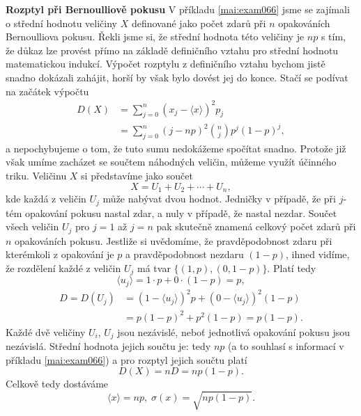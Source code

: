 \begin{mdframed}[style=mdexam]
  \begin{example}\label{mai:exam072}
    \textbf{Rozptyl při Bernoulliově pokusu}\newline
    V příkladu \ref{mai:exam066} jsme se zajímali o střední hodnotu veličiny \(X\) definované jako
    počet zdarů při \(n\) opakováních Bernoulliova pokusu. Řekli jsme si, že střední hodnota této
    veličiny je \(np\) s tím, že důkaz lze provést přímo na základě definičního vztahu pro střední
    hodnotu matematickou indukcí. Výpočet rozptylu z definičního vztahu bychom jistě snadno dokázali
    zahájit, horší by však bylo dovést jej do konce. Stačí se podívat na začátek výpočtu
    \begin{align*}
      D(X) &= \sum_{j=0}^n \left(x_j - \langle x \rangle\right)^2p_j             \\
           &= \sum_{j=0}^n \left(j - np\right)^2\binom{n}{j}p^j(1 - p)^j,
    \end{align*}
    a nepochybujeme o tom, že tuto sumu nedokážeme spočítat snadno. Protože již však umíme zacházet
    se součtem náhodných veličin, můžeme využít účinného triku. Veličinu \(X\) si představíme jako
    součet
    \begin{equation*}
      X = U_1 + U_2 + \cdots + U_n,
    \end{equation*}
    kde každá z veličin \(U_j\) může nabývat dvou hodnot. Jedničky v případě, že při \(j\)-tém
    opakování pokusu nastal zdar, a nuly v případě, že nastal nezdar. Součet všech veličin \(U_j\)
    pro \(j = 1\) až \(j = n\) pak skutečně znamená celkový počet zdarů při \(n\) opakováních
    pokusu. Jestliže si uvědomíme, že pravděpodobnost zdaru při kterémkoli z opakování je \(p\) a
    pravděpodobnost nezdaru \((1 - p)\), ihned vidíme, že rozdělení každé z veličin \(U_j\) má tvar
    \(\lbrace(1, p), (0, 1 - p)\rbrace\). Platí tedy
    \begin{equation*}
      \langle u_j\rangle = 1\cdot p + 0 \cdot (1 - p) = p,
    \end{equation*}
    \begin{align*}
      D = D(U_j) &= \left( 1 - \langle u_j\rangle\right)^2p 
                  + \left( 0 - \langle u_j\rangle\right)^2(1 - p)   \\
                 &= p(1 - p)^2 + p^2(1 - p) = p(1 - p).
    \end{align*}
    Každé dvě veličiny \(U_i\), \(U_j\) jsou nezávislé, neboť jednotlivá opakování pokusu jsou
    nezávislá. Střední hodnota jejich součtu je: tedy \(np\) (a to souhlasí s informací v příkladu
    \ref{mai:exam066}) a pro rozptyl jejich součtu platí
    \begin{equation*}
      D(X) = nD = np(1 - p).
    \end{equation*}
    Celkově tedy dostáváme
    \begin{equation*}
      \langle x \rangle = np, \; \sigma(x) = \sqrt{np(1 - p)}.
    \end{equation*}
  \end{example}
\end{mdframed}